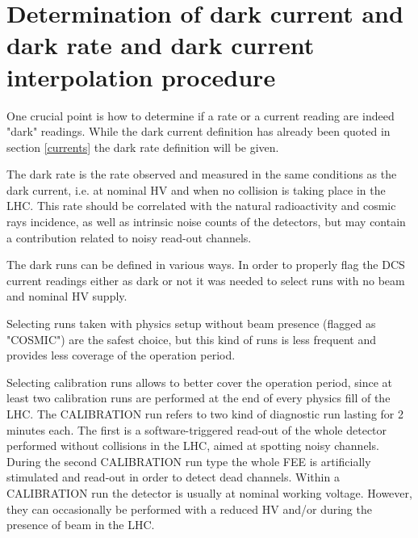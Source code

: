 \section{Determination of dark current and dark rate and dark current interpolation procedure}
One crucial point is how to determine if a rate or a current reading are indeed "dark" readings.
While the dark current definition has already been quoted in section \ref{currents} the dark rate definition will be given.

The dark rate is the rate observed and measured in the same conditions as the dark current, i.e. at nominal HV and when no collision is taking place in the LHC.
This rate should be correlated with the natural radioactivity and cosmic rays incidence, as well as intrinsic noise counts of the detectors, but may contain a contribution related to noisy read-out channels.

The dark runs can be defined in various ways.
In order to properly flag the DCS current readings either as dark or not it was needed to select runs with no beam and nominal HV supply.

Selecting runs taken with physics setup without beam presence (flagged as "COSMIC") are the safest choice, but this kind of runs is less frequent and provides less coverage of the operation period.

Selecting calibration runs allows to better cover the operation period, since at least two calibration runs are performed at the end of every physics fill of the LHC.
The CALIBRATION run refers to two kind of diagnostic run lasting for 2 minutes each.
The first is a software-triggered read-out of the whole detector performed without collisions in the LHC, aimed at spotting noisy channels.
During the second CALIBRATION run type the whole FEE is artificially stimulated and read-out in order to detect dead channels.
Within a CALIBRATION run the detector is usually at nominal working voltage.
However, they can occasionally be performed with a reduced HV and/or during the presence of beam in the LHC.

